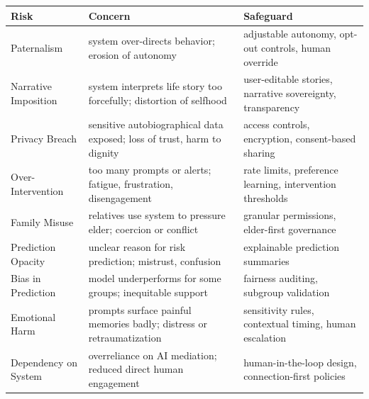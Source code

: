 \documentclass[
  journal,
]{IEEEtran}%
\newcounter{none} %
\begin{document}
{\def\LTcaptype{none} %
\begin{longtable}[]{@{}
  >{\raggedright\arraybackslash}p{}
  >{\raggedright\arraybackslash}p{}
  >{\raggedright\arraybackslash}p{}@{}}
\toprule\noalign{}
\begin{minipage}[b]{\linewidth}\raggedright
Risk
\end{minipage} & \begin{minipage}[b]{\linewidth}\raggedright
Concern
\end{minipage} & \begin{minipage}[b]{\linewidth}\raggedright
Safeguard
\end{minipage} \\
\midrule\noalign{}
\endhead
\bottomrule\noalign{}
\endlastfoot
Paternalism & system over-directs behavior; erosion of autonomy &
adjustable autonomy, opt-out controls, human override \\
Narrative Imposition & system interprets life story too forcefully;
distortion of selfhood & user-editable stories, narrative sovereignty,
transparency \\
Privacy Breach & sensitive autobiographical data exposed; loss of trust,
harm to dignity & access controls, encryption, consent-based sharing \\
Over-Intervention & too many prompts or alerts; fatigue, frustration,
disengagement & rate limits, preference learning, intervention
thresholds \\
Family Misuse & relatives use system to pressure elder; coercion or
conflict & granular permissions, elder-first governance \\
Prediction Opacity & unclear reason for risk prediction; mistrust,
confusion & explainable prediction summaries \\
Bias in Prediction & model underperforms for some groups; inequitable
support & fairness auditing, subgroup validation \\
Emotional Harm & prompts surface painful memories badly; distress or
retraumatization & sensitivity rules, contextual timing, human
escalation \\
Dependency on System & overreliance on AI mediation; reduced direct
human engagement & human-in-the-loop design, connection-first
policies \\
\end{longtable}
}
\end{document}
